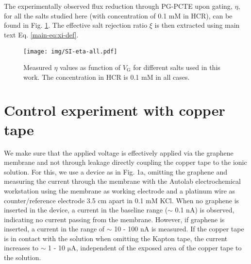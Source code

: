 \documentclass[manuscript=suppinfo,email=true, hyperref=true, keywords=false]{achemso}
\newcommand{\Fig}{Fig.}
\begin{document}
The experimentally observed flux reduction through PG-PCTE upon
gating, $\eta$, for all the salts studied here (with concentration of
0.1 mM in HCR), can be found in \Fig{} \ref{fig:eta-all}. The effective salt
rejection ratio $\xi$ is then extracted using main text
Eq. \ref{main-eq:xi-def}.

\begin{figure}[htbp]
  \centering
  \texttt{[image: img/SI-eta-all.pdf]}
  \caption{Measured $\eta$ values as function of $V_{\mathrm{G}}$ for
    different salts used in this work. The concentration in HCR is 0.1
    mM in all cases.}
  \label{fig:eta-all}
\end{figure}


\section{Control experiment with copper tape}
\label{sec:copper}
We make sure that the applied voltage is effectively applied via the
graphene membrane and not through leakage directly coupling the
copper tape to the ionic solution. For this, we use a device as in \Fig
1a, omitting the graphene and measuring the current through the
membrane with the Autolab electrochemical workstation using the
membrane as working electrode and a platinum wire as counter/reference
electrode 3.5 cm apart in 0.1 mM KCl. When no graphene is inserted in
the device, a current in the baseline range ($\sim$ 0.1 nA) is
observed, indicating no current passing from the membrane. However, if
graphene is inserted, a current in the range of $\sim$ 10 - 100 nA is
measured. If the copper tape is in contact with the solution when
omitting the Kapton tape, the current increases to $\sim$ 1 - 10
$\mathrm{\mu}$A, independent of the exposed area of the copper tape to
the solution.
\end{document}

